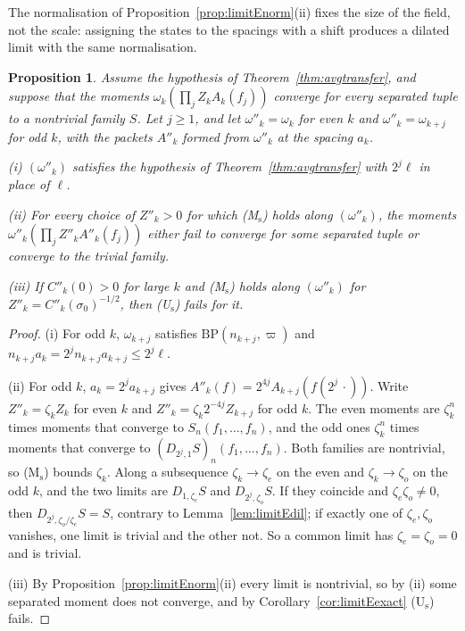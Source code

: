 \documentclass[aps,prd,twocolumn,superscriptaddress,nofootinbib,longbibliography,floatfix,amsmath,amssymb,10pt]{revtex4-2}
\newtheorem{proposition}[theorem]{Proposition}
\theoremstyle{definition}
\theoremstyle{remark}
\begin{document}
The normalisation of Proposition~\ref{prop:limitEnorm}(ii) fixes the size
of the field, not the scale: assigning the states to the spacings with a
shift produces a dilated limit with the same normalisation.

\begin{proposition}\label{prop:limitEscale}
Assume the hypothesis of Theorem~\textup{\ref{thm:avgtransfer}}, and
suppose that the moments $\omega_k(\prod_jZ_kA_k(f_j))$ converge for every
separated tuple to a nontrivial family $S$. Let $j\ge1$, and let
$\omega''_k=\omega_k$ for even $k$ and $\omega''_k=\omega_{k+j}$ for odd
$k$, with the packets $A''_k$ formed from $\omega''_k$ at the spacing $a_k$.

\textup{(i)} $(\omega''_k)$ satisfies the hypothesis of
Theorem~\textup{\ref{thm:avgtransfer}} with $2^j\ell$ in place of $\ell$.

\textup{(ii)} For every choice of $Z''_k>0$ for which \textup{(M$_{\mathrm
s}$)} holds along $(\omega''_k)$, the moments $\omega''_k(\prod_jZ''_k
A''_k(f_j))$ either fail to converge for some separated tuple or converge
to the trivial family.

\textup{(iii)} If $C''_k(0)>0$ for large $k$ and \textup{(M$_{\mathrm s}$)}
holds along $(\omega''_k)$ for $Z''_k=C''_k(\sigma_0)^{-1/2}$, then
\textup{(U$_{\mathrm s}$)} fails for it.
\end{proposition}

\begin{proof}
(i) For odd $k$, $\omega_{k+j}$ satisfies $\mathrm{BP}(n_{k+j},\varpi)$ and
$n_{k+j}a_k=2^jn_{k+j}a_{k+j}\le2^j\ell$.

(ii) For odd $k$, $a_k=2^ja_{k+j}$ gives $A''_k(f)=2^{4j}A_{k+j}(f(2^j\,
\cdot))$. Write $Z''_k=\zeta_kZ_k$ for even $k$ and $Z''_k=\zeta_k2^{-4j}
Z_{k+j}$ for odd $k$. The even moments are $\zeta_k^n$ times moments that
converge to $S_n(f_1,\dots,f_n)$, and the odd ones $\zeta_k^n$ times
moments that converge to $(D_{2^j,1}S)_n(f_1,\dots,f_n)$. Both families are
nontrivial, so (M$_{\mathrm s}$) bounds $\zeta_k$. Along a subsequence
$\zeta_k\to\zeta_e$ on the even and $\zeta_k\to\zeta_o$ on the odd $k$, and
the two limits are $D_{1,\zeta_e}S$ and $D_{2^j,\zeta_o}S$. If they
coincide and $\zeta_e\zeta_o\ne0$, then $D_{2^j,\zeta_o/\zeta_e}S=S$,
contrary to Lemma~\ref{lem:limitEdil}; if exactly one of $\zeta_e,\zeta_o$
vanishes, one limit is trivial and the other not. So a common limit has
$\zeta_e=\zeta_o=0$ and is trivial.

(iii) By Proposition~\ref{prop:limitEnorm}(ii) every limit is nontrivial,
so by (ii) some separated moment does not converge, and by
Corollary~\ref{cor:limitEexact} (U$_{\mathrm s}$) fails.
\end{proof}
\end{document}
